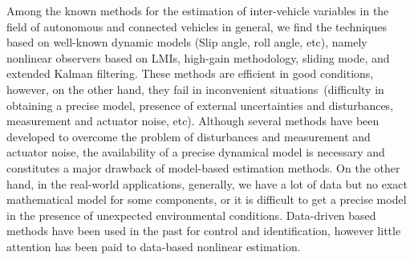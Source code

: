 \documentclass[a4paper,11pt]{article}
\begin{document}
Among the known methods for the estimation of inter-vehicle variables in the field of autonomous and connected vehicles in general, we find the techniques based on well-known dynamic models (Slip angle, roll angle, etc), namely nonlinear observers based on LMIs, high-gain methodology, sliding mode, and extended Kalman filtering. 
These methods are efficient in good conditions, however, on the other hand, they fail in inconvenient situations~(difficulty in obtaining a precise model, presence of external uncertainties and disturbances, measurement and actuator noise, etc). Although several methods have been developed to overcome the problem of disturbances and measurement and actuator noise,
the availability of a precise dynamical model is necessary and constitutes a major drawback of model-based estimation methods. On the other hand, in the real-world applications, generally, we have a lot of data but no exact mathematical model for some components, or it is difficult to get a precise model in the presence of unexpected environmental conditions. %
Data-driven based methods have been used in the past for control and identification, however little attention has been paid to data-based nonlinear estimation.%


\end{document}
